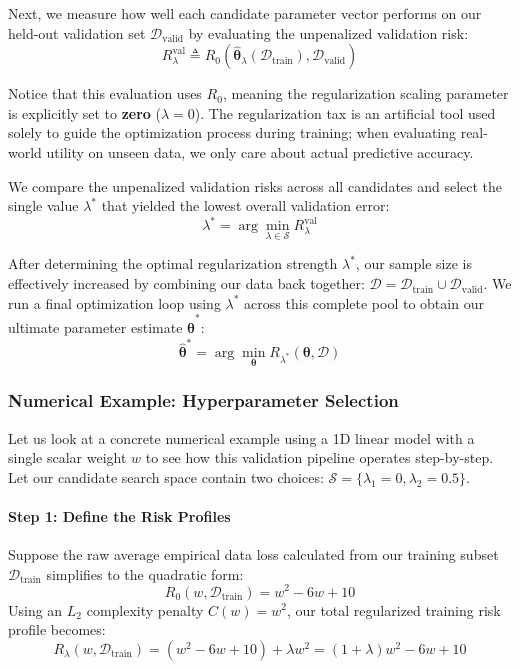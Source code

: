 \documentclass{article}
\begin{document}
Next, we measure how well each candidate parameter vector performs on our held-out validation set $\mathcal{D}_{\text{valid}}$ by evaluating the unpenalized validation risk:
\begin{equation}
R^{\text{val}}_\lambda \triangleq R_0(\hat{\boldsymbol{\theta}}_\lambda(\mathcal{D}_{\text{train}}), \mathcal{D}_{\text{valid}})
\end{equation}

Notice that this evaluation uses $R_0$, meaning the regularization scaling parameter is explicitly set to \textbf{zero} ($\lambda = 0$). The regularization tax is an artificial tool used solely to guide the optimization process during training; when evaluating real-world utility on unseen data, we only care about actual predictive accuracy.

We compare the unpenalized validation risks across all candidates and select the single value $\lambda^*$ that yielded the lowest overall validation error:
\begin{equation}
\lambda^* = \arg\min_{\lambda \in \mathcal{S}} R^{\text{val}}_\lambda
\end{equation}

After determining the optimal regularization strength $\lambda^*$, our sample size is effectively increased by combining our data back together: $\mathcal{D} = \mathcal{D}_{\text{train}} \cup \mathcal{D}_{\text{valid}}$. We run a final optimization loop using $\lambda^*$ across this complete pool to obtain our ultimate parameter estimate $\hat{\boldsymbol{\theta}}^*$:
\begin{equation}
\hat{\boldsymbol{\theta}}^* = \arg\min_{\boldsymbol{\theta}} R_{\lambda^*}(\boldsymbol{\theta}, \mathcal{D})
\end{equation}

\subsubsection{Numerical Example: Hyperparameter Selection}

Let us look at a concrete numerical example using a 1D linear model with a single scalar weight $w$ to see how this validation pipeline operates step-by-step. Let our candidate search space contain two choices: $\mathcal{S} = \{\lambda_1 = 0, \lambda_2 = 0.5\}$.

\paragraph{Step 1: Define the Risk Profiles}
Suppose the raw average empirical data loss calculated from our training subset $\mathcal{D}_{\text{train}}$ simplifies to the quadratic form:
\begin{equation}
R_0(w, \mathcal{D}_{\text{train}}) = w^2 - 6w + 10
\end{equation}
Using an $L_2$ complexity penalty $C(w) = w^2$, our total regularized training risk profile becomes:
\begin{equation}
R_\lambda(w, \mathcal{D}_{\text{train}}) = (w^2 - 6w + 10) + \lambda w^2 = (1 + \lambda)w^2 - 6w + 10
\end{equation}
\end{document}
